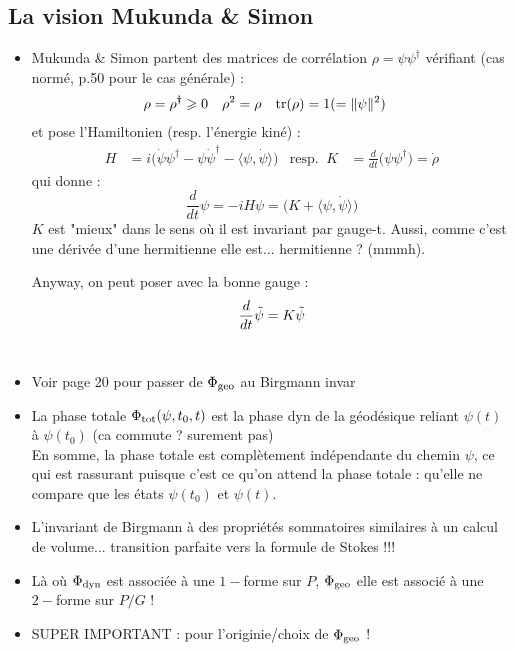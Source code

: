 \subsection{La vision Mukunda \& Simon \cite{mukunda_quantum_1993,mukunda_quantum_1993-1}}

\begin{itemize}
	\item Mukunda \& Simon\cite[p. 10]{mukunda_quantum_1993} partent des matrices de corrélation $\rho = \psi\psi^\dagger$ vérifiant (cas normé, p.50 pour le cas générale) :
	\begin{align*}
		\rho &= \rho^\dagger \geqslant 0  &  \rho^2 &= \rho  &  \text{\normalfont tr}(\rho) &= 1 (=\|\psi\|^2)
	\end{align*}
	et pose l'Hamiltonien  (resp. l'énergie kiné) :
	\begin{align*}
		H &= i\big( \dot{\psi} \psi^\dagger - \psi\dot{\psi}^\dagger - \langle \psi, \dot{\psi}\rangle\big)  &  \text{resp. }\ K &= \frac{d}{dt}\big( \psi\psi^\dagger \big) = \dot{\rho}
	\end{align*}
	qui donne :
	\[\frac{d}{dt}\psi = -i H\psi = \big( K + \langle\psi, \dot{\psi}\rangle \big)\]
	$K$ est "mieux" dans le sens où il est invariant par gauge-t. Aussi, comme c'est une dérivée d'une hermitienne elle est... hermitienne ? (mmmh).
	
	Anyway, on peut poser avec la bonne gauge :
	\[\frac{d}{dt}\Tilde{\psi} = K\Tilde{\psi}\]
	\\
	
	\item Voir page 20 pour passer de $\Phi_{\text{\normalfont geo}}$ au Birgmann invar
	\\
	
	\item La phase totale $\Phi_{\text{\normalfont tot}}(\psi,t_0,t)$ est la phase dyn de la géodésique reliant $\psi(t)$ à $\psi(t_0)$ (ca commute ? surement pas)
	\\
	En somme, la phase totale est complètement indépendante du chemin $\psi$, ce qui est rassurant puisque c'est ce qu'on attend la phase totale : qu'elle ne compare que les états $\psi(t_0)$ et $\psi(t)$.
	
	\item L'invariant de Birgmann à des propriétés sommatoires similaires à un calcul de volume... transition parfaite vers la formule de Stokes !!!
	
	\item Là où $\Phi_{\text{\normalfont dyn}}$ est associée à une $1-$forme sur $P$, $\Phi_{\text{\normalfont geo}}$ elle est associé à une $2-$forme sur $P/G$ !
	
	\item SUPER IMPORTANT : \cite[(8.6),p.51]{mukunda_quantum_1993} pour l'originie/choix de $\Phi_{\text{\normalfont geo}}$ !
\end{itemize}





